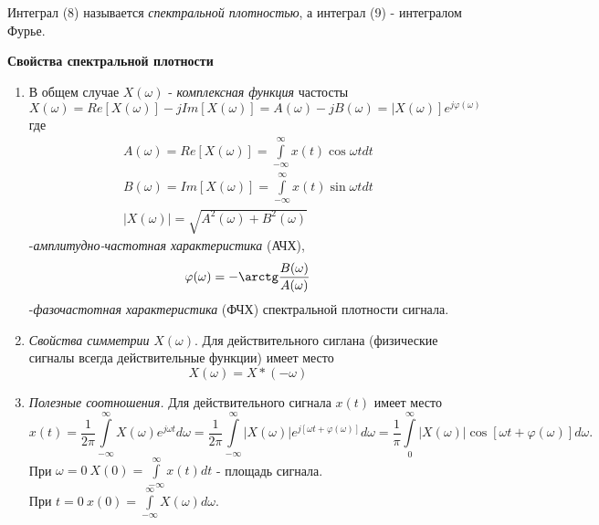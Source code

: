 \indent Интеграл (8) называется {\it спектральной плотностью}, а интеграл (9) - интегралом Фурье.\\
\begin{center}
	{\bf Свойства спектральной плотности}
\end{center}
\begin{enumerate}
	\renewcommand{\labelenumi}{\arabic{enumi})}
	\item В общем случае $X(\omega)$ - {\it комплексная функция} частосты
	$$
		X(\omega) = Re\left[X(\omega)\right] - jIm\left[X(\omega)\right] = A(\omega)-jB(\omega) = \left|X(\omega)\right]e^{j\varphi(\omega)}
	$$
	где 
	\begin{align}
		A(\omega) = Re\left[X(\omega)\right] = \int\limits_{-\infty}^{\infty}x(t){\cos \omega t}dt \\
		B(\omega) = Im\left[X(\omega)\right] = \int\limits_{-\infty}^{\infty}x(t){\sin \omega t}dt \\
		\left|X(\omega)\right| = \sqrt{A^2(\omega) + B^2(\omega)} 
	\end{align}
	-{\it амплитудно-частотная характеристика} (АЧХ),
		$$\varphi(\omega) = -{\arctg \frac{B(\omega)}{A(\omega)}} $$
	-{\it фазочастотная характеристика} (ФЧХ) спектральной плотности сигнала.
	\item {\it Свойства симметрии} $X(\omega).$  Для действительного сиглана (физические сигналы всегда действительные функции) имеет место $$X(\omega)=X*(-\omega) $$
	\item {\it Полезные соотношения.} Для действительного сигнала $x(t)$ имеет место 
	$$
	x(t) = \frac{1}{2\pi} \int\limits_{-\infty}^{\infty}X(\omega)e^{j\omega t}d\omega = \frac{1}{2\pi} \int\limits_{-\infty}^{\infty}\left|X(\omega)\right|e^{j\left[\omega t + \varphi(\omega)\right]}d\omega = \frac{1}{\pi} \int\limits_{0}^{\infty}\left|X(\omega)\right| {\cos \left[\omega t + \varphi(\omega)\right] }d\omega.
	$$
	При $\omega = 0\  X(0) = \int\limits_{-\infty}^{\infty}x(t)dt $ - площадь сигнала.\\
	При $t=0\  x(0) = \int\limits_{-\infty}^{\infty}X(\omega)d\omega.$
\end{enumerate}


